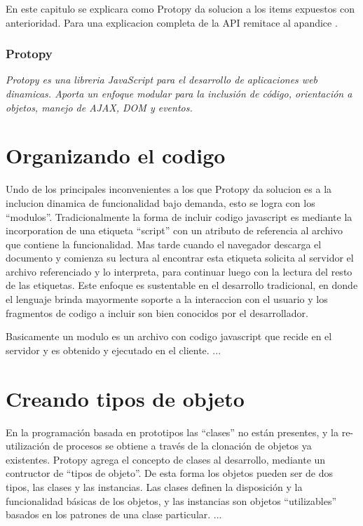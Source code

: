 En este capitulo se explicara como Protopy da solucion a los items expuestos con
anterioridad. Para una explicacion completa de la API remitace al apandice
.

\subsubsection*{Protopy}
\textit{Protopy es una libreria JavaScript para el desarrollo de aplicaciones
web dinamicas. Aporta un enfoque modular para la inclusión de código,
orientación a objetos, manejo de AJAX, DOM y eventos.}

\section{Organizando el codigo}
Undo de los principales inconvenientes a los que Protopy da solucion es a la
inclucion dinamica de funcionalidad bajo demanda, esto se logra con los
``modulos''.
Tradicionalmente la forma de incluir codigo javascript es mediante la
incorporation de una etiqueta ``script'' con un atributo de referencia
al archivo que contiene la funcionalidad. Mas tarde cuando el navegador descarga
el documento y comienza su lectura al encontrar esta etiqueta solicita
al servidor el archivo referenciado y lo interpreta, para continuar luego con la
lectura del resto de las etiquetas.
Este enfoque es sustentable en el desarrollo tradicional, en donde el lenguaje
brinda mayormente soporte a la interaccion con el usuario y los fragmentos de
codigo a incluir son bien conocidos por el desarrollador.

Basicamente un modulo es un archivo con codigo javascript que recide en el
servidor y es obtenido y ejecutado en el cliente.
...

\section{Creando tipos de objeto}
En la programación basada en prototipos las ``clases'' no están presentes, y la
re-utilización de procesos se obtiene a través de la clonación de objetos ya
existentes. 
Protopy agrega el concepto de clases al desarrollo, mediante un contructor de
``tipos de objeto''. De esta forma los objetos pueden ser de dos tipos, las
clases y las instancias. Las clases definen la disposición y la funcionalidad
básicas de los objetos, y las instancias son objetos ``utilizables'' basados en
los patrones de una clase particular.
...

